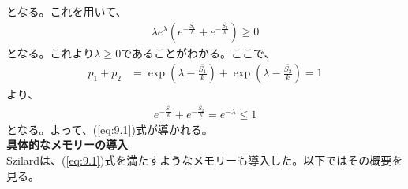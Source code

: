 \documentclass[a4paper,11pt]{jsarticle}
\numberwithin{equation}{section}
\begin{document}
となる。これを用いて、
\begin{align}
    \lambda e^{\lambda}(e^{-\frac{\bar{S_1}}{k}} + e^{-\frac{\bar{S_2}}{k}}) \geq 0
\end{align}
となる。これより$\lambda \geq 0$であることがわかる。ここで、
\begin{align}
    p_1 + p_2 &= \exp(\lambda - \frac{\bar{S_1}}{k}) + \exp(\lambda - \frac{\bar{S_2}}{k}) = 1
\end{align}
より、
\begin{align}
    e^{-\frac{\bar{S_1}}{k}} + e^{-\frac{\bar{S_2}}{k}}  = e^{-\lambda} \leq 1
\end{align}
となる。よって、(\ref{eq:9.1})式が導かれる。\hfill\qedsymbol\\

\textbf{具体的なメモリーの導入}\\
Szilardは、(\ref{eq:9.1})式を満たすようなメモリーも導入した。以下ではその概要を見る。\\
\end{document}
